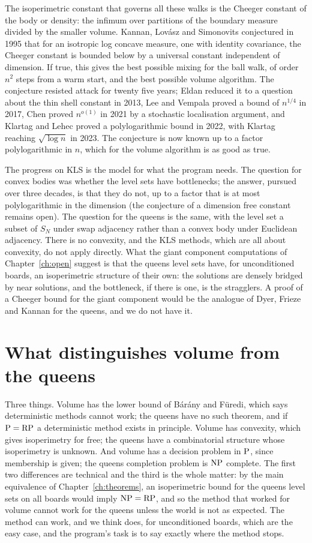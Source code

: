 The isoperimetric constant that governs all these walks is the Cheeger constant of the body or density: the infimum over partitions of the boundary measure divided by the smaller volume. Kannan, Lov\'asz and Simonovits conjectured in 1995 that for an isotropic log concave measure, one with identity covariance, the Cheeger constant is bounded below by a universal constant independent of dimension. If true, this gives the best possible mixing for the ball walk, of order $n^2$ steps from a warm start, and the best possible volume algorithm. The conjecture resisted attack for twenty five years; Eldan reduced it to a question about the thin shell constant in 2013, Lee and Vempala proved a bound of $n^{1/4}$ in 2017, Chen proved $n^{o(1)}$ in 2021 by a stochastic localisation argument, and Klartag and Lehec proved a polylogarithmic bound in 2022, with Klartag~\cite{Klartag2023} reaching $\sqrt{\log n}$ in 2023. The conjecture is now known up to a factor polylogarithmic in $n$, which for the volume algorithm is as good as true.

The progress on KLS is the model for what the program needs. The question for convex bodies was whether the level sets have bottlenecks; the answer, pursued over three decades, is that they do not, up to a factor that is at most polylogarithmic in the dimension (the conjecture of a dimension free constant remains open). The question for the queens is the same, with the level set a subset of $S_N$ under swap adjacency rather than a convex body under Euclidean adjacency. There is no convexity, and the KLS methods, which are all about convexity, do not apply directly. What the giant component computations of Chapter~\ref{ch:open} suggest is that the queens level sets have, for unconditioned boards, an isoperimetric structure of their own: the solutions are densely bridged by near solutions, and the bottleneck, if there is one, is the stragglers. A proof of a Cheeger bound for the giant component would be the analogue of Dyer, Frieze and Kannan for the queens, and we do not have it.

\section{What distinguishes volume from the queens}

Three things. Volume has the lower bound of B\'ar\'any and F\"uredi, which says deterministic methods cannot work; the queens have no such theorem, and if $\mathrm{P} = \mathrm{RP}$ a deterministic method exists in principle. Volume has convexity, which gives isoperimetry for free; the queens have a combinatorial structure whose isoperimetry is unknown. And volume has a decision problem in $\mathrm{P}$, since membership is given; the queens completion problem is $\mathrm{NP}$ complete. The first two differences are technical and the third is the whole matter: by the main equivalence of Chapter~\ref{ch:theorems}, an isoperimetric bound for the queens level sets on all boards would imply $\mathrm{NP} = \mathrm{RP}$, and so the method that worked for volume cannot work for the queens unless the world is not as expected. The method can work, and we think does, for unconditioned boards, which are the easy case, and the program's task is to say exactly where the method stops.
